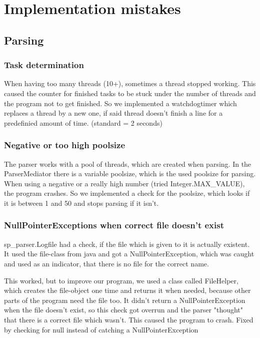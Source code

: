 \section{Implementation mistakes}










\subsection{Parsing} 
\subsubsection{Task determination} 
When having too many threads (10+), sometimes a thread stopped working. This caused the counter for finished tasks
to be stuck under the number of threads and the program not to get finished.
So we implemented a watchdogtimer which replaces a thread by a new one, if said thread doesn't finish a line for a 
predefinied amount of time. (standard = 2 seconds)

\subsubsection{Negative or too high poolsize}
The parser works with a pool of threads, which are created when parsing. In the ParserMediator there is
a variable poolsize, which is the used poolsize for parsing.
When using a negative or a really high number (tried Integer.MAX\_VALUE), the program crashes. 
So we implemented a check for the poolsize, which looks if it is between 1 and 50 and stops parsing if it isn't.

\subsubsection{NullPointerExceptions when correct file doesn't exist}
sp_parser.Logfile had a check, if the file which is given to it is actually existent. It used the file-class from java
and got a NullPointerException, which was caught and used as an indicator, that there is no file for the correct name.

This worked, but to improve our program, we used a class called FileHelper, which creates the file-object one time and
returns it when needed, because other parts of the program need the file too. It didn't return a NullPointerException when 
the file doesn't exist, so this check got overrun and the parser "thought" that there is a correct file which wasn't.
This caused the program to crash. Fixed by checking for null instead of catching a NullPointerException


